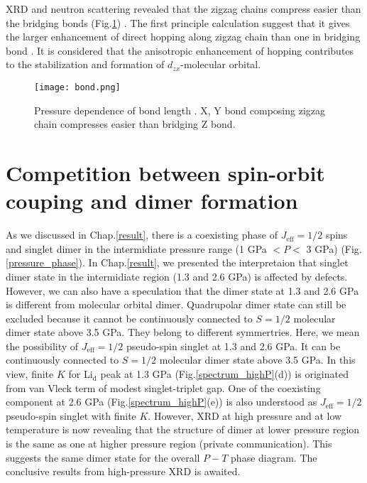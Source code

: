 XRD and neutron scattering revealed that the zigzag chains compress easier than the bridging bonds (Fig.\ref{bond}) \cite{veiga2017pressure, takayama2018pressure}.
The first principle calculation suggest that it gives the larger enhancement of direct hopping along zigzag chain than one in bridging bond \cite{Kim2016}.
It is considered that the anisotropic enhancement of hopping contributes to the stabilization and formation of $d_{zx}$-molecular orbital.

\begin{figure}
  \centering
  \texttt{[image: bond.png]}
  \caption{Pressure dependence of bond length \cite{veiga2017pressure, takayama2018pressure}. X, Y bond composing zigzag chain compresses easier than bridging Z bond.}
  \label{bond}
\end{figure}

\section{Competition between spin-orbit couping and dimer formation}
As we discussed in Chap.\ref{result}, there is a coexisting phase of $J_\mathrm{eff} = 1/2$ spins and singlet dimer in the intermidiate pressure range (1 GPa $< P <$ 3 GPa)
(Fig.\ref{pressure_phase}).
In Chap.\ref{result}, we presented the interpretaion that singlet dimer state in the intermidiate region (1.3 and 2.6 GPa) is affected by defects.
However, we can also have a speculation that the dimer state at 1.3 and 2.6 GPa is different from molecular orbital dimer.
Quadrupolar dimer state can still be excluded because it cannot be continuously connected to $S = 1/2$ molecular dimer state above 3.5 GPa.
They belong to different symmertries.
Here, we mean the possibility of $J_\mathrm{eff} = 1/2$ pseudo-spin singlet at 1.3 and 2.6 GPa.
It can be continuously connected to $S = 1/2$ molecular dimer state above 3.5 GPa.
In this view, finite $K$ for Li$_\mathrm{d}$ peak at 1.3 GPa (Fig.\ref{spectrum_highP}(d)) is originated from van Vleck term of modest singlet-triplet gap.
One of the coexisting component at 2.6 GPa (Fig.\ref{spectrum_highP}(e)) is also understood as $J_\mathrm{eff} = 1/2$ pseudo-spin singlet with finite $K$.
However, XRD at high pressure and at low temperature is now revealing that the structure of dimer at lower pressure region is the same as one at higher pressure region
(private communication).
This suggests the same dimer state for the overall $P-T$ phase diagram.
The conclusive results from high-pressure XRD is awaited.

